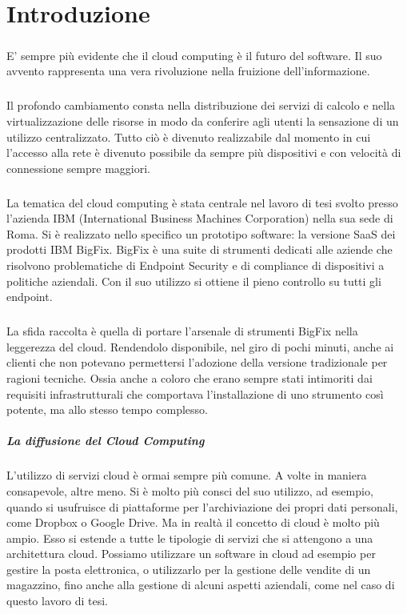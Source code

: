 \chapter{Introduzione}

\paragraph{}
E' sempre più evidente che il cloud computing è il futuro del software. Il suo avvento rappresenta una vera rivoluzione nella fruizione dell'informazione.
\paragraph{}
Il profondo cambiamento consta nella distribuzione dei servizi di calcolo e nella virtualizzazione delle risorse in modo da conferire agli utenti la sensazione di un utilizzo centralizzato. Tutto ciò è divenuto realizzabile dal momento in cui l'accesso alla rete è divenuto possibile da sempre più dispositivi e con velocità di connessione sempre maggiori.
\paragraph{}
La tematica del cloud computing è stata centrale nel lavoro di tesi svolto presso l'azienda IBM (International Business Machines Corporation) nella sua sede di Roma. Si è realizzato nello specifico un prototipo software: la versione SaaS dei prodotti IBM BigFix. BigFix è una suite di strumenti dedicati alle aziende che risolvono problematiche di Endpoint Security e di compliance di dispositivi a politiche aziendali. Con il suo utilizzo si ottiene il pieno controllo su tutti gli endpoint.
\paragraph{}
La sfida raccolta è quella di portare l'arsenale di strumenti BigFix nella leggerezza del cloud. Rendendolo disponibile, nel giro di pochi minuti, anche ai clienti che non potevano permettersi l'adozione della versione tradizionale per ragioni tecniche. Ossia anche a coloro che erano sempre stati intimoriti dai requisiti infrastrutturali che comportava l'installazione di uno strumento così potente, ma allo stesso tempo complesso.

\paragraph{La diffusione del Cloud Computing}
L'utilizzo di servizi cloud è ormai sempre più comune. A volte in maniera consapevole, altre meno. Si è molto più consci del suo utilizzo, ad esempio, quando si usufruisce di piattaforme per l'archiviazione dei propri dati personali, come Dropbox o Google Drive. Ma in realtà il concetto di cloud è molto più ampio. Esso si estende a tutte le tipologie di servizi che si attengono a una architettura cloud. Possiamo utilizzare un software in cloud ad esempio per gestire la posta elettronica, o utilizzarlo per la gestione delle vendite di un magazzino, fino anche alla gestione di alcuni aspetti aziendali, come nel caso di questo lavoro di tesi.
